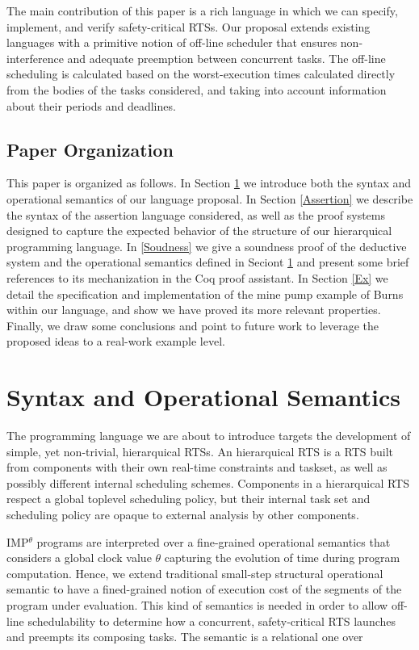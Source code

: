 \documentclass[]{llncs}
\begin{document}
The main contribution of this paper is a rich language in which we can
specify, implement, and verify safety-critical RTSs. Our proposal
extends existing languages with a primitive notion of off-line
scheduler that ensures non-interference and adequate preemption
between concurrent tasks. The off-line scheduling is calculated based
on the worst-execution times calculated directly from the bodies of
the tasks considered, and taking into account information about their
periods and deadlines.

\subsection{Paper Organization}

This paper is organized as follows. In Section \ref{SyntaxSemantics}
we introduce both the syntax and operational semantics of our language
proposal. In Section \ref{Assertion} we describe the syntax of the
assertion language considered, as well as the proof systems designed
to capture the expected behavior of the structure of our hierarquical
programming language. In \ref{Soudness} we give a soundness proof of
the deductive system and the operational semantics defined in Seciont
\ref{SyntaxSemantics} and present some brief references to its
mechanization in the Coq proof assistant. In Section \ref{Ex} we
detail the specification and implementation of the mine pump example
of Burns \cite{} within our language, and show we have proved its more
relevant properties. Finally, we draw some conclusions and point to
future work to leverage the proposed ideas to a real-work example
level.



\section{Syntax and Operational Semantics}
\label{SyntaxSemantics}

The programming language we are about to introduce targets the
development of simple, yet non-trivial, hierarquical RTSs. An
hierarquical RTS is a RTS built from components with their own
real-time constraints and taskset, as well as possibly different
internal scheduling schemes. Components in a hierarquical RTS respect
a global toplevel scheduling policy, but their internal task set and
scheduling policy are opaque to external analysis by other components.

IMP$^\theta$ programs are interpreted over a fine-grained operational
semantics that considers a global clock value $\theta$ capturing the
evolution of time during program computation. Hence, we extend
traditional small-step structural operational semantic to have a
fined-grained notion of execution cost of the segments of the program
under evaluation. This kind of semantics is needed in order to allow
off-line schedulability to determine how a concurrent, safety-critical
RTS launches and preempts its composing tasks. The semantic is a
relational one over 
\end{document}
